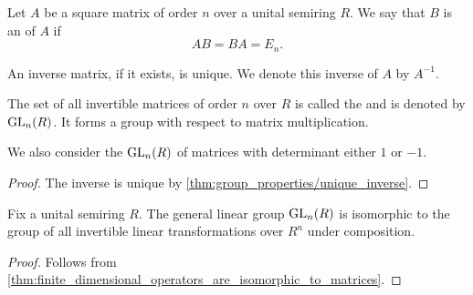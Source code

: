 \begin{definition}\label{def:inverse_matrix}
  Let \( A \) be a square matrix of order \( n \) over a unital semiring \( R \). We say that \( B \) is an  of \( A \) if
  \begin{equation*}
    AB = BA = E_n.
  \end{equation*}

  An inverse matrix, if it exists, is unique. We denote this inverse of \( A \) by \( A^{-1} \).

  The set of all invertible matrices of order \( n \) over \( R \) is called the  and is denoted by \( \operatorname{GL}_n(R) \). It forms a group with respect to matrix multiplication.

  We also consider the  \( \operatorname{GL}_n(R) \) of matrices with determinant either \( 1 \) or \( -1 \).
\end{definition}
\begin{proof}
  The inverse is unique by \cref{thm:group_properties/unique_inverse}.
\end{proof}

\begin{proposition}\label{def:matrix_is_invertible_iff_singular}
  Fix a unital semiring \( R \). The general linear group \( \operatorname{GL}_n(R) \) is isomorphic to the group of all invertible linear transformations over \( R^n \) under composition.
\end{proposition}
\begin{proof}
  Follows from \cref{thm:finite_dimensional_operators_are_isomorphic_to_matrices}.
\end{proof}
